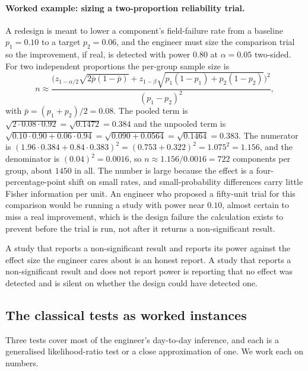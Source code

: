 

\paragraph{Worked example: sizing a two-proportion reliability
trial.} A redesign is meant to lower a component's field-failure
rate from a baseline $p_{1} = 0.10$ to a target $p_{2} = 0.06$, and
the engineer must size the comparison trial so the improvement, if
real, is detected with power $0.80$ at $\alpha = 0.05$ two-sided.
For two independent proportions the per-group sample size is
\[
n \approx \frac{\bigl(z_{1-\alpha/2}\sqrt{2\bar{p}(1-\bar{p})}
+ z_{1-\beta}\sqrt{p_{1}(1-p_{1}) + p_{2}(1-p_{2})}\bigr)^{2}}
{(p_{1} - p_{2})^{2}},
\]
with $\bar{p} = (p_{1}+p_{2})/2 = 0.08$. The pooled term is
$\sqrt{2 \cdot 0.08 \cdot 0.92} = \sqrt{0.1472} = 0.384$ and the
unpooled term is $\sqrt{0.10 \cdot 0.90 + 0.06 \cdot 0.94} =
\sqrt{0.090 + 0.0564} = \sqrt{0.1464} = 0.383$. The numerator is
$(1.96 \cdot 0.384 + 0.84 \cdot 0.383)^{2} = (0.753 + 0.322)^{2}
= 1.075^{2} = 1.156$, and the denominator is $(0.04)^{2} = 0.0016$,
so $n \approx 1.156/0.0016 = 722$ components per group, about
$1450$ in all. The number is large because the effect is a
four-percentage-point shift on small rates, and small-probability
differences carry little Fisher information per unit. An engineer
who proposed a fifty-unit trial for this comparison would be
running a study with power near $0.10$, almost certain to miss a
real improvement, which is the design failure the calculation
exists to prevent before the trial is run, not after it returns a
non-significant result.

A study that reports a non-significant result and reports its
power against the effect size the engineer cares about is an
honest report. A study that reports a non-significant result and
does not report power is reporting that no effect was detected
and is silent on whether the design could have detected one.

\subsection{The classical tests as worked instances}

Three tests cover most of the engineer's day-to-day inference, and
each is a generalised likelihood-ratio test or a close
approximation of one. We work each on numbers.

